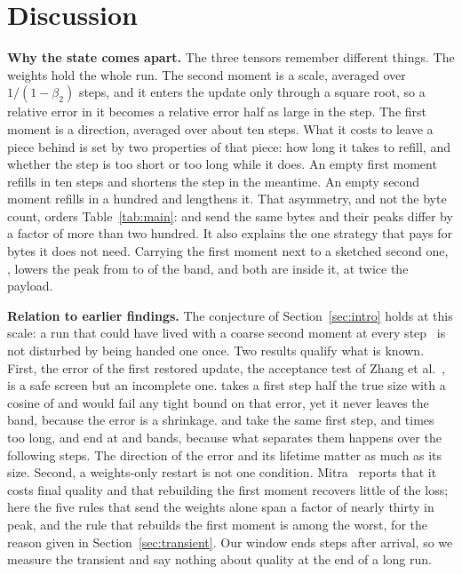 \section{Discussion}
\label{sec:discussion}

\textbf{Why the state comes apart.} The three tensors remember different things. The weights hold the whole run. The
second moment is a scale, averaged over $1/(1-\beta_2)$ steps, and it enters the update only through a square root, so
a relative error in it becomes a relative error half as large in the step. The first moment is a direction, averaged over
about ten steps. What it costs to leave a piece behind is set by two properties of that piece: how long it takes to
refill, and whether the step is too short or too long while it does. An empty first moment refills in ten steps and
shortens the step in the meantime. An empty second moment refills in a hundred and lengthens it. That asymmetry, and not
the byte count, orders Table~\ref{tab:main}:  and  send the same bytes and their peaks differ by a
factor of more than two hundred. It also explains the one strategy that pays for bytes it does not need. Carrying the
first moment next to a sketched second one, , lowers the peak from \ratioWVrone{} to \ratioWMVrone{} of
the band, and both are inside it, at twice the payload.

\textbf{Relation to earlier findings.} The conjecture of Section~\ref{sec:intro} holds at this scale: a run that could
have lived with a coarse second moment at every step~\cite{shazeer2018adafactor,dettmers2022eightbit} is not disturbed
by being handed one once. Two results qualify what is known. First, the error of the first restored update, the
acceptance test of Zhang et al.~\cite{zhang2026guarded}, is a safe screen but an incomplete one.  takes a
first step half the true size with a cosine of \cosV{} and would fail any tight bound on that error, yet it never
leaves the band, because the error is a shrinkage.  and  take the same first step, \stepZero{}
and \stepFresh{} times too long, and end at \ratioWZero{} and \ratioWFresh{} bands, because what separates them happens
over the following steps. The direction of the error and its lifetime matter as much as its size. Second, a
weights-only restart is not one condition. Mitra~\cite{mitra2026orbittrace} reports that it costs final quality and that
rebuilding the first moment recovers little of the loss; here the five rules that send the weights alone span a factor
of nearly thirty in peak, and the rule that rebuilds the first moment is among the worst, for the reason given in
Section~\ref{sec:transient}. Our window ends \horizon{} steps after arrival, so we measure the transient and say
nothing about quality at the end of a long run.

